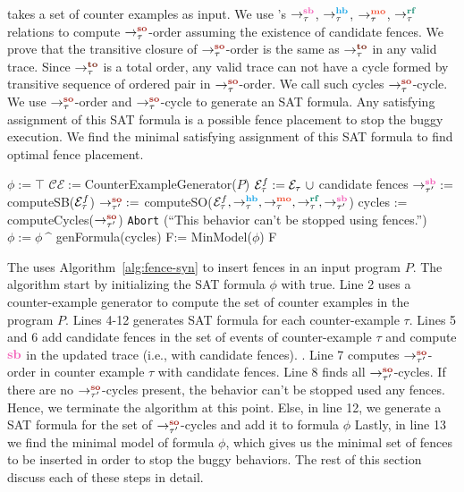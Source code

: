 \ourtechnique takes a set of counter examples as input.
We use \cc 's $\setSB$, $\setHB$, $\setMO$, $\setRF$ relations to compute 
$ \setSO $-order assuming the existence of candidate fences.
We prove that the transitive closure of $ \setSO $-order is the same as 
$ \setTO $ in any valid \cc trace. 
Since $ \setTO $ is a total order, any valid \cc trace can not have a 
cycle formed by transitive sequence of ordered pair in $ \setSO $-order. 
We call such cycles $\setSO$-cycle. 
We use $ \setSO $-order and $ \setSO $-cycle to generate an SAT formula. 
Any satisfying assignment of this SAT formula is a possible fence 
placement to stop the buggy execution. We find the minimal satisfying assignment of this SAT formula to find optimal fence placement. 

\begin{algorithm}
	\caption{\ourtechnique}
	\begin{algorithmic}[1]	
		\State $\phi := \top$
		\State $ \mathcal{CE} := $CounterExampleGenerator($P$)
			\State $ \events_\tau^f := \events_\tau\ \union $ candidate fences
			\State $ \seqb{\tau'}{}{} := $ computeSB($\mathcal{E}_\tau^f$) \State $ \so{\tau'}{}{} := $ computeSO($\events_\tau^f, \setHB, \setMO, \setRF, \seqb{\tau'}{}{}$)
			\State cycles := computeCycles($ \so{\tau'}{}{} $)
				\State \texttt{Abort} (``This behavior can't be stopped using \cc fences.'')
				\State \Return
			\EndIf
			\State $\phi := \phi\ \^ $ genFormula(cycles)
		\EndFor
		\State F:= MinModel($ \phi $)
		\State \Return F
%		
		\EndProcedure
		\label{alg:fence-syn}
	\end{algorithmic}
\end{algorithm}

The \ourtool uses Algorithm~\ref{alg:fence-syn} to insert fences in an 
input program $ P $. The algorithm start by initializing the 
SAT formula $ \phi $ with true.  Line 2 uses a counter-example generator 
to compute the set of counter examples in the program $ P $. 
Lines 4-12 generates SAT formula for each counter-example $ \tau $.
Lines 5 and 6 add candidate fences in the set of events of counter-example 
$ \tau $ and compute $ \lsb $ in the updated trace (i.e., with candidate 
fences). 
.
Line 7 computes $ \so{\tau'}{}{} $-order in counter example $ \tau $ with candidate fences.
Line 8 finds all $ \so{\tau'}{}{} $-cycles. If there are no $ \so{\tau'}{}{} $-cycles 
present, the behavior can't be stopped used any \cc fences. Hence, we 
terminate the algorithm at this point.
Else, in line 12, we generate a SAT formula for the set of $ \so{\tau'}{}{} $-cycles and add it to formula $ \phi $
Lastly, in line 13 we find the minimal model of formula $ \phi $, which 
gives us the minimal set of fences to be inserted in order to stop the 
buggy behaviors.
The rest of this section discuss each of these steps in detail.

